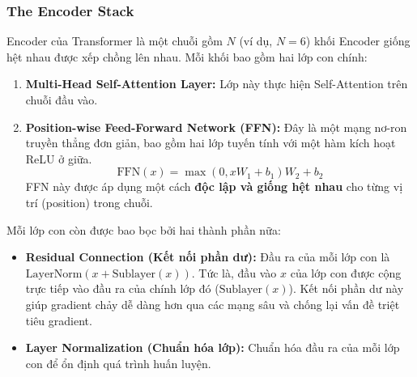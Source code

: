 \subsubsection{The Encoder Stack}
Encoder của Transformer là một chuỗi gồm $N$ (ví dụ, $N=6$) khối Encoder giống hệt nhau được xếp chồng lên nhau. Mỗi khối bao gồm hai lớp con chính:
\begin{enumerate}
    \item \textbf{Multi-Head Self-Attention Layer:} Lớp này thực hiện Self-Attention trên chuỗi đầu vào.
    \item \textbf{Position-wise Feed-Forward Network (FFN):} Đây là một mạng nơ-ron truyền thẳng đơn giản, bao gồm hai lớp tuyến tính với một hàm kích hoạt ReLU ở giữa.
        $$ \text{FFN}(x) = \max(0, xW_1 + b_1)W_2 + b_2 $$
        FFN này được áp dụng một cách \textbf{độc lập và giống hệt nhau} cho từng vị trí (position) trong chuỗi.
\end{enumerate}
Mỗi lớp con còn được bao bọc bởi hai thành phần nữa:
\begin{itemize}
    \item \textbf{Residual Connection (Kết nối phần dư):} Đầu ra của mỗi lớp con là $\text{LayerNorm}(x + \text{Sublayer}(x))$. Tức là, đầu vào $x$ của lớp con được cộng trực tiếp vào đầu ra của chính lớp đó ($\text{Sublayer}(x)$). Kết nối phần dư này giúp gradient chảy dễ dàng hơn qua các mạng sâu và chống lại vấn đề triệt tiêu gradient.
    \item \textbf{Layer Normalization (Chuẩn hóa lớp):} Chuẩn hóa đầu ra của mỗi lớp con để ổn định quá trình huấn luyện.
\end{itemize}
